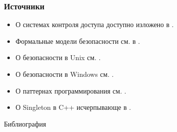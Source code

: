 \begin{frame}
    \frametitle{Источники}
    
    \begin{itemize}
        \item О системах контроля доступа доступно изложено в \cite{bib:tannen:os}.
    
        \item Формальные модели безопасности см. в \cite{bib:zegzda:secbase}.

        \item О безопасности в Unix см. \cite{bib:robachevsky:unix}. 
    
        \item О безопасности в Windows см. \cite{bib:russinovich:wininternals}. 

        \item О паттернах программирования см. \cite{bib:gamma:patterns}. 
        
        \item О Singleton в C++ исчерпывающе в \cite{bib:alexandrescu:moderncpp}.
    \end{itemize}
\end{frame}


\begin{frame}[allowframebreaks]{Библиография}
    
    
\end{frame}


